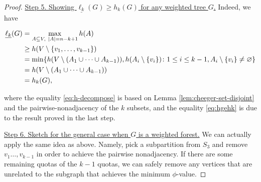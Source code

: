 \documentclass[12pt, reqno]{article}
\begin{document}
\begin{proof}
\vspace{0.3cm}

\noindent\underline{Step 5. Showing $\underline{\ell_k}(G)\ge h_k(G)$ for any weighted tree $G$.}
\newline\noindent Indeed, we have
\begin{center}\begin{align}\underline{\ell_k}(G)&=\max_{A\subseteq V,~|A|=n-k+1}h(A)\notag
\\&\ge h(V\setminus\{v_1,\dots,v_{k-1}\})\notag
\\&=\min\{h(V\setminus(A_1\cup\dots\cup A_{k-1})),h(A_i\setminus\{v_i\})\colon 1\le i\le k-1,A_i\setminus\{v_i\}\ne\varnothing\}\label{eq:h-decompose}
\\&=h(V\setminus(A_1\cup\dots\cup A_{k-1}))\label{eq:hgehk}
\\&=h_k(G),\notag\end{align}\end{center}
where the equality \eqref{eq:h-decompose} is based on {Lemma \ref{lem:cheeger-set-disjoint}} and the pairwise-nonadjacency of the $k$ subsets, and the equality \eqref{eq:hgehk} is due to the result proved in the last step.

\vspace{0.3cm}

\noindent\underline{Step 6. Sketch for the general case when $G$ is a weighted forest.}
\newline\noindent We can actually apply the same idea as above. Namely, pick a subpartition from $S_3$ and remove $v_1\dots,v_{k-1}$ in order to achieve the pairwise nonadjacency. If there are some remaining quotas of the $k-1$ quotas, we can safely remove any vertices that are unrelated to the subgraph that achieves the minimum $\phi$-value.

\end{proof}
\end{document}
